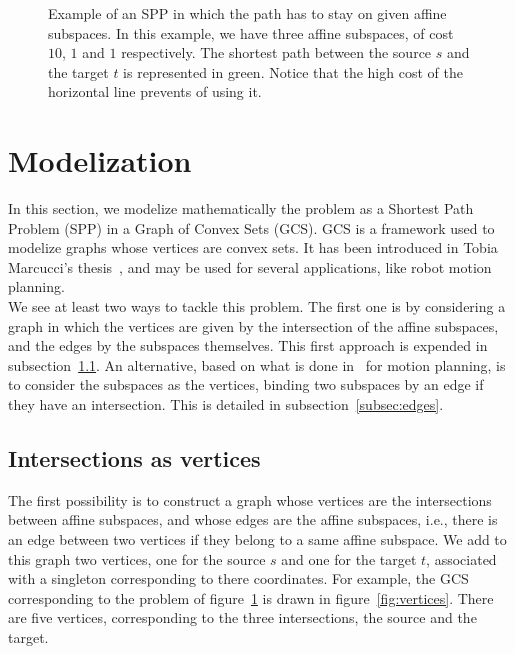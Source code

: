 \documentclass[a4paper, 12pt]{article}
\begin{document}
\begin{figure}[!htb]
    \centering
    \caption{Example of an SPP in which the path has to stay on given affine subspaces. In this example, we have three affine subspaces, of cost $10$, $1$ and $1$ respectively. The shortest path between the source $s$ and the target $t$ is represented in green. Notice that the high cost of the horizontal line prevents of using it.}\label{fig:SPP-problem}
\end{figure}

\section{Modelization}\label{sec:modelization}
In this section, we modelize mathematically the problem as a Shortest Path Problem (SPP) in a Graph of Convex Sets (GCS). GCS is a framework used to modelize graphs whose vertices are convex sets. It has been introduced in Tobia Marcucci's thesis~\cite{Tobia}, and may be used for several applications, like robot motion planning.\\
We see at least two ways to tackle this problem. The first one is by considering a graph in which the vertices are given by the intersection of the affine subspaces, and the edges by the subspaces themselves. This first approach is expended in subsection~\ref{subsec:vertices}. An alternative, based on what is done in~\cite[Chapter~11]{Tobia} for motion planning, is to consider the subspaces as the vertices, binding two subspaces by an edge if they have an intersection. This is detailed in subsection~\ref{subsec:edges}.

\subsection{Intersections as vertices}\label{subsec:vertices}
The first possibility is to construct a graph whose vertices are the intersections between affine subspaces, and whose edges are the affine subspaces, i.e., there is an edge between two vertices if they belong to a same affine subspace. We add to this graph two vertices, one for the source $s$ and one for the target $t$, associated with a singleton corresponding to there coordinates. For example, the GCS corresponding to the problem of figure~\ref{fig:SPP-problem} is drawn in figure~\ref{fig:vertices}. There are five vertices, corresponding to the three intersections, the source and the target.
\end{document}
